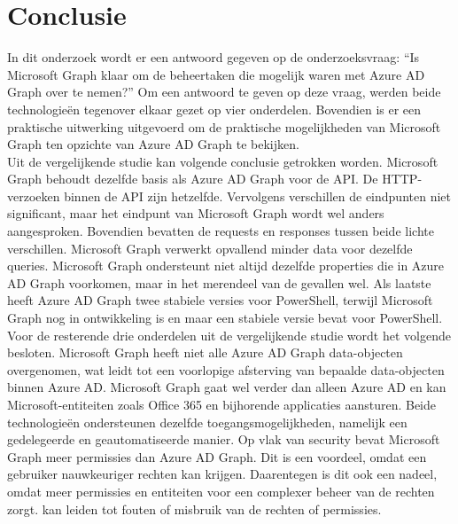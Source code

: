 
\chapter{Conclusie}%
\label{ch:conclusie}



In dit onderzoek wordt er een antwoord gegeven op de onderzoeksvraag: “Is Microsoft Graph klaar om de beheertaken die mogelijk waren met Azure AD Graph over te nemen?” Om een antwoord te geven op deze vraag, werden beide technologieën tegenover elkaar gezet op vier onderdelen. Bovendien is er een praktische uitwerking uitgevoerd om de praktische mogelijkheden van Microsoft Graph ten opzichte van Azure \Ac{AD} Graph te bekijken. \\

Uit de vergelijkende studie kan volgende conclusie getrokken worden. Microsoft Graph behoudt dezelfde basis als Azure \Ac{AD} Graph voor de \Ac{API}. De \Ac{HTTP}-verzoeken binnen de \Ac{API} zijn hetzelfde. Vervolgens verschillen de eindpunten niet significant, maar het eindpunt van Microsoft Graph wordt wel anders aangesproken. Bovendien bevatten de requests en responses tussen beide lichte verschillen. Microsoft Graph verwerkt opvallend minder data voor dezelfde queries. Microsoft Graph ondersteunt niet altijd dezelfde properties die in Azure \Ac{AD} Graph voorkomen, maar in het merendeel van de gevallen wel. Als laatste heeft Azure \Ac{AD} Graph twee stabiele versies voor PowerShell, terwijl Microsoft Graph nog in ontwikkeling is en maar een stabiele versie bevat voor PowerShell. \\

Voor de resterende drie onderdelen uit de vergelijkende studie wordt het volgende besloten. Microsoft Graph heeft niet alle Azure \Ac{AD} Graph data-objecten overgenomen, wat leidt tot een voorlopige afsterving van bepaalde data-objecten binnen Azure \Ac{AD}. Microsoft Graph gaat wel verder dan alleen Azure \Ac{AD} en kan Microsoft-entiteiten zoals Office 365 en bijhorende applicaties aansturen. Beide technologieën ondersteunen dezelfde toegangsmogelijkheden, namelijk een gedelegeerde en geautomatiseerde manier. Op vlak van security bevat Microsoft Graph meer permissies dan Azure \Ac{AD} Graph. Dit is een voordeel, omdat een gebruiker nauwkeuriger rechten kan krijgen. Daarentegen is dit ook een nadeel, omdat meer permissies en entiteiten voor een complexer beheer van de rechten zorgt. kan leiden tot fouten of misbruik van de rechten of permissies. \\ 

